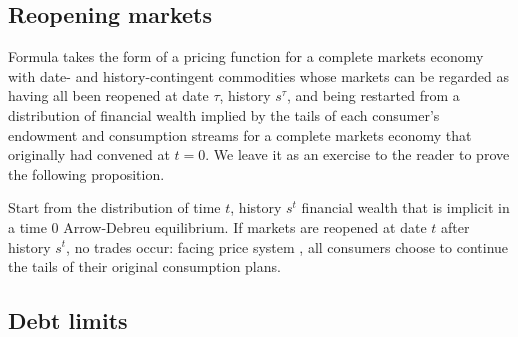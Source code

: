





\subsection{Reopening markets}

Formula   takes the form of a pricing
function for a complete markets economy with date- and history-contingent
commodities whose markets can be regarded as having all been reopened at date $\tau$, history
$s^\tau$, and being restarted from a distribution of  financial wealth  implied by the tails of each consumer's
endowment and consumption streams for a complete markets economy that originally had convened at $t=0$.
 We leave it as an exercise to the
reader to prove the following proposition.


\medskip
{} Start from the distribution of time
$t$, history $s^t$ financial wealth that is implicit in a time $0$ Arrow-Debreu
equilibrium. If markets are reopened at date $t$ after history
$s^t$, no trades  occur: facing   price system
, all consumers choose to continue the  tails of their
original consumption plans.
\medskip
{}






 
\subsection{Debt limits}

